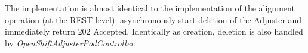 \documentclass[../main.tex]{subfiles}
\begin{document}
The implementation is almost identical to the implementation of the alignment operation (at the REST level): asynchronously start deletion of the Adjuster and immediately return 202 Accepted. Identically as creation, deletion is also handled by \textit{OpenShiftAdjusterPodController}.
\end{document}
